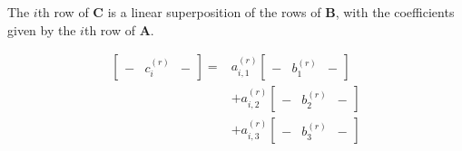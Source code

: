 The $i$th row of $\mathbf{C}$ is a linear superposition of the rows of $\mathbf{B}$, with the coefficients given by the $i$th row of $\mathbf{A}$.

\begin{equation}
\begin{array}{rl}
\left[\begin{array}{ccc} - & c^{(r)}_i & - \end{array}\right] = & a^{(r)}_{i,1} \left[\begin{array}{ccc} - & b^{(r)}_1 & - \end{array}\right]\\
&+ a^{(r)}_{i,2} \left[\begin{array}{ccc} - & b^{(r)}_2 & - \end{array}\right]\\
&+ a^{(r)}_{i,3} \left[\begin{array}{ccc} - & b^{(r)}_3 & - \end{array}\right]
\end{array}
\end{equation}




